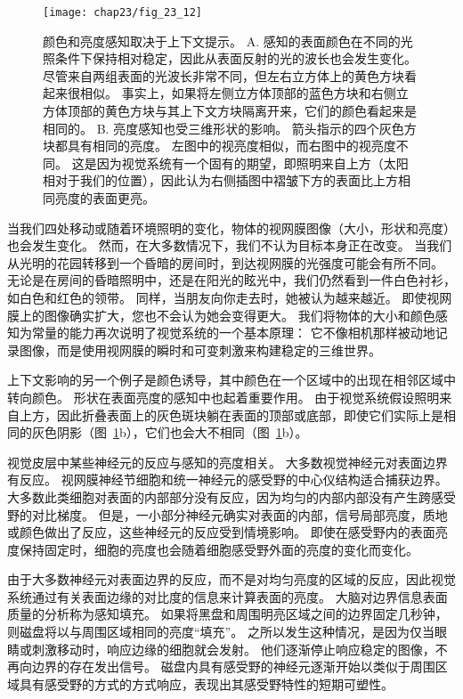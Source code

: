 \begin{figure}[htbp]
	\centering
	\texttt{[image: chap23/fig\_23\_12]}
	\caption{颜色和亮度感知取决于上下文提示。
		A. 感知的表面颜色在不同的光照条件下保持相对稳定，因此从表面反射的光的波长也会发生变化。
		尽管来自两组表面的光波长非常不同，但左右立方体上的黄色方块看起来很相似。
		事实上，如果将左侧立方体顶部的蓝色方块和右侧立方体顶部的黄色方块与其上下文方块隔离开来，它们的颜色看起来是相同的。
		B. 亮度感知也受三维形状的影响。
		箭头指示的四个灰色方块都具有相同的亮度。
		左图中的视亮度相似，而右图中的视亮度不同。
		这是因为视觉系统有一个固有的期望，即照明来自上方（太阳相对于我们的位置），因此认为右侧插图中褶皱下方的表面比上方相同亮度的表面更亮\cite{adelson1993perceptual}。}
	\label{fig:23_12}
\end{figure}


当我们四处移动或随着环境照明的变化，物体的视网膜图像（大小，形状和亮度）也会发生变化。
然而，在大多数情况下，我们不认为目标本身正在改变。
当我们从光明的花园转移到一个昏暗的房间时，到达视网膜的光强度可能会有所不同。
无论是在房间的昏暗照明中，还是在阳光的眩光中，我们仍然看到一件白色衬衫，如白色和红色的领带。
同样，当朋友向你走去时，她被认为越来越近。
即使视网膜上的图像确实扩大，您也不会认为她会变得更大。
我们将物体的大小和颜色感知为常量的能力再次说明了视觉系统的一个基本原理：
它不像相机那样被动地记录图像，而是使用视网膜的瞬时和可变刺激来构建稳定的三维世界。


上下文影响的另一个例子是颜色诱导，其中颜色在一个区域中的出现在相邻区域中转向颜色。
形状在表面亮度的感知中也起着重要作用。
由于视觉系统假设照明来自上方，因此折叠表面上的灰色斑块躺在表面的顶部或底部，即使它们实际上是相同的灰色阴影（图~\ref{fig:23_12}b），它们也会大不相同（图~\ref{fig:23_12}b）。


视觉皮层中某些神经元的反应与感知的亮度相关。
大多数视觉神经元对表面边界有反应。
视网膜神经节细胞和统一神经元的感受野的中心仪结构适合捕获边界。
大多数此类细胞对表面的内部部分没有反应，因为均匀的内部内部没有产生跨感受野的对比梯度。
但是，一小部分神经元确实对表面的内部，信号局部亮度，质地或颜色做出了反应，这些神经元的反应受到情境影响。
即使在感受野内的表面亮度保持固定时，细胞的亮度也会随着细胞感受野外面的亮度的变化而变化。


由于大多数神经元对表面边界的反应，而不是对均匀亮度的区域的反应，因此视觉系统通过有关表面边缘的对比度的信息来计算表面的亮度。
大脑对边界信息表面质量的分析称为感知填充。
如果将黑盘和周围明亮区域之间的边界固定几秒钟，则磁盘将以与周围区域相同的亮度“填充”。
之所以发生这种情况，是因为仅当眼睛或刺激移动时，响应边缘的细胞就会发射。
他们逐渐停止响应稳定的图像，不再向边界的存在发出信号。
磁盘内具有感受野的神经元逐渐开始以类似于周围区域具有感受野的方式的方式响应，表现出其感受野特性的短期可塑性。


